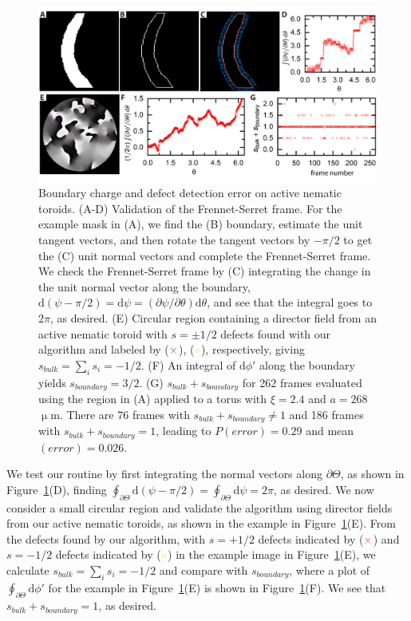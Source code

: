 \begin{figure}
  \centering
  \includegraphics{figures/C3/Ch3-Figs_EdgeChargeErr.png}
  \caption{Boundary charge and defect detection error on active nematic toroids.
  (A-D) Validation of the Frennet-Serret frame.
  For the example mask in (A), we find the (B) boundary, estimate the unit tangent vectors, and then rotate the tangent vectors by $-\pi/2$ to get the (C) unit normal vectors and complete the Frennet-Serret frame.
  We check the Frennet-Serret frame by (C) integrating the change in the unit normal vector along the boundary, $\textrm{d}(\psi - \pi/2) = \textrm{d}\psi = (\partial \psi/\partial \theta) \textrm{d}\theta$, and see that the integral goes to $2 \pi$, as desired.
  (E) Circular region containing a director field from an active nematic toroid with $s = \pm 1/2$ defects found with our algorithm and labeled by (${\color{magenta} \times}$), (${\color{yellow} \circ}$), respectively, giving $s_{bulk} = \sum_i s_i = -1/2$.
  (F) An integral of $\textrm{d}\phi'$ along the boundary yields $s_{boundary} = 3/2$.
  (G) $s_{bulk} + s_{boundary}$ for 262 frames evaluated using the region in (A) applied to a torus with $\xi = 2.4$ and $a = 268$ $\upmu$m.
  There are 76 frames with $s_{bulk} + s_{boundary} \neq 1$ and 186 frames with $s_{bulk} + s_{boundary} = 1$, leading to $P(error) = 0.29$ and mean$(error) = 0.026$.}\label{f:3-EdgeChargeErr}
\end{figure}

We test our routine by first integrating the normal vectors along $\partial \Theta$, as shown in Figure~\ref{f:3-EdgeChargeErr}(D), finding $\oint_{\partial \Theta} \textrm{d}(\psi-\pi/2) = \oint_{\partial \Theta} \textrm{d}\psi = 2\pi$, as desired.
We now consider a small circular region and validate the algorithm using director fields from our active nematic toroids, as shown in the example in Figure~\ref{f:3-EdgeChargeErr}(E).
From the defects found by our algorithm, with $s = +1/2$ defects indicated by (${\color{magenta} \times}$) and $s = -1/2$ defects indicated by (${\color{yellow} \circ}$) in the example image in Figure~\ref{f:3-EdgeChargeErr}(E), we calculate $s_{bulk}= \sum\limits_i s_i=-1/2$ and compare with $s_{boundary}$, where a plot of $\oint_{\partial \Theta} \textrm{d}\phi'$ for the example in Figure~\ref{f:3-EdgeChargeErr}(E) is shown in Figure~\ref{f:3-EdgeChargeErr}(F).
We see that $s_{bulk}+s_{boundary} = 1$, as desired.

